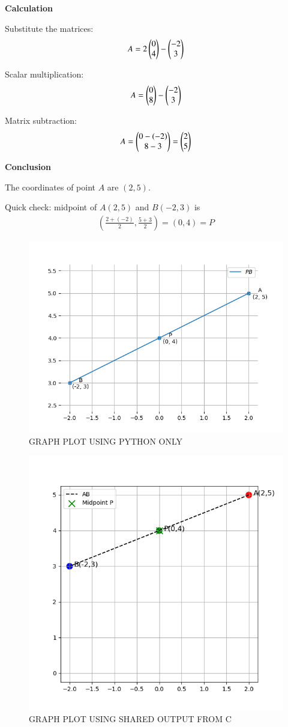 \documentclass[journal]{IEEEtran}
\begin{document}
\textbf{Calculation}  

Substitute the matrices:  
\begin{align*}
    A = 2 \myvec{0 \\ 4} - \myvec{-2 \\ 3}
\end{align*}



Scalar multiplication:  
\begin{align*}
    A = \myvec{0 \\ 8} - \myvec{-2 \\ 3}
\end{align*}


Matrix subtraction:  
\begin{align*}
A = \myvec{0 - (-2) \\ 8 - 3} 
= \myvec{2 \\ 5}    
\end{align*}



\textbf{Conclusion} 

The coordinates of point $A$ are $(2,5)$.  

Quick check: midpoint of $A(2,5)$ and $B(-2,3)$ is  
\begin{align*}
    \left(\frac{2+(-2)}{2}, \frac{5+3}{2}\right) = (0,4) = P
\end{align*}

 

\begin{figure}[H]
    \centering
    \includegraphics[width=0.5\columnwidth]{figs/Figure_1.png}
    \caption{GRAPH PLOT USING PYTHON ONLY}
    \label{fig:placeholder}
\end{figure}

\begin{figure}[H]
    \centering
    \includegraphics[width=0.5\columnwidth]{figs/Figure_2.png}
    \caption{GRAPH PLOT USING SHARED OUTPUT FROM C}
    \label{fig:placeholder}
\end{figure}
\end{document}
